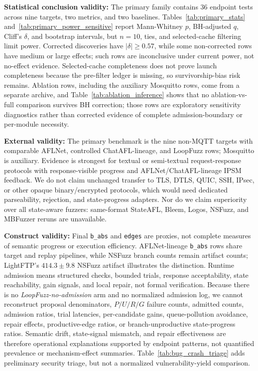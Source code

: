 \documentclass[final,5p,times,number]{elsarticle}
\begin{document}
\textbf{Statistical conclusion validity:} The primary family contains 36 endpoint tests across nine targets, two metrics, and two baselines. Tables~\ref{tab:primary_stats} and~\ref{tab:primary_power_sensitive} report Mann-Whitney $p$, BH-adjusted $q$, Cliff's $\delta$, and bootstrap intervals, but $n=10$, ties, and selected-cache filtering limit power. Corrected discoveries have $|\delta|\ge0.57$, while some non-corrected rows have medium or large effects; such rows are inconclusive under current power, not no-effect evidence. Selected-cache completeness does not prove launch completeness because the pre-filter ledger is missing, so survivorship-bias risk remains. Ablation rows, including the auxiliary Mosquitto rows, come from a separate archive, and Table~\ref{tab:ablation_inference} shows that no ablation-vs-full comparison survives BH correction; those rows are exploratory sensitivity diagnostics rather than corrected evidence of complete admission-boundary or per-module necessity.

\textbf{External validity:} The primary benchmark is the nine non-MQTT targets with comparable AFLNet, controlled ChatAFL-lineage, and LoopFuzz rows; Mosquitto is auxiliary. Evidence is strongest for textual or semi-textual request-response protocols with response-visible progress and AFLNet/ChatAFL-lineage IPSM feedback. We do not claim unchanged transfer to TLS, DTLS, QUIC, SSH, IPsec, or other opaque binary/encrypted protocols, which would need dedicated parseability, rejection, and state-progress adapters. Nor do we claim superiority over all state-aware fuzzers: same-format StateAFL, Bleem, Logos, NSFuzz, and MBFuzzer reruns are unavailable.

\textbf{Construct validity:} Final \texttt{b\_abs} and \texttt{edges} are proxies, not complete measures of semantic progress or execution efficiency. AFLNet-lineage \texttt{b\_abs} rows share target and replay pipelines, while NSFuzz branch counts remain artifact counts; LightFTP's $414.3{\pm}9.8$ NSFuzz artifact illustrates the distinction. Runtime admission means structured checks, bounded trials, response acceptability, state reachability, gain signals, and local repair, not formal verification. Because there is no \emph{LoopFuzz-no-admission} arm and no normalized admission log, we cannot reconstruct proposal denominators, $P/U/R/G$ failure counts, admitted counts, admission ratios, trial latencies, per-candidate gains, queue-pollution avoidance, repair effects, productive-edge ratios, or branch-unproductive state-progress ratios. Semantic drift, state-signal mismatch, and repair effectiveness are therefore operational explanations supported by endpoint patterns, not quantified prevalence or mechanism-effect summaries. Table~\ref{tab:bug_crash_triage} adds preliminary security triage, but not a normalized vulnerability-yield comparison.
\end{document}
